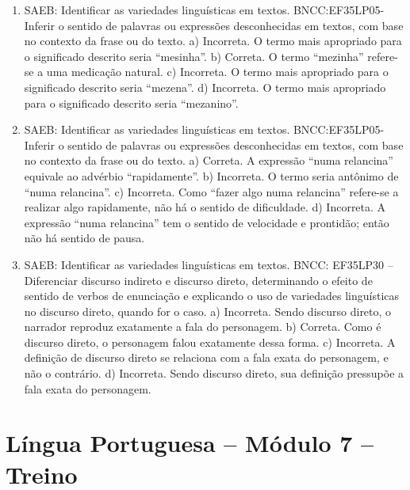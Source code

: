 \begin{enumerate}
\item
SAEB: Identificar as variedades linguísticas em textos. BNCC:EF35LP05- Inferir o sentido de palavras ou expressões desconhecidas em textos, com base no contexto da frase ou do texto.
a) Incorreta. O termo mais apropriado para o significado descrito seria
“mesinha”.
b) Correta. O termo “mezinha” refere-se a uma medicação natural.
c) Incorreta. O termo mais apropriado para o significado descrito seria “mezena”.
d) Incorreta. O termo mais apropriado para o significado descrito seria
“mezanino”.

\item
SAEB: Identificar as variedades linguísticas em textos. BNCC:EF35LP05- Inferir o sentido de palavras ou expressões desconhecidas em textos, com base no contexto da frase ou do texto.
a) Correta. A expressão “numa relancina” equivale ao advérbio “rapidamente”.
b) Incorreta. O termo seria antônimo de “numa relancina”.
c) Incorreta. Como “fazer algo numa relancina” refere-se a realizar algo rapidamente,
não há o sentido de dificuldade.
d) Incorreta. A expressão “numa relancina” tem o sentido de velocidade e prontidão;
então não há sentido de pausa.

\item
SAEB: Identificar as variedades linguísticas em textos. BNCC: EF35LP30 – Diferenciar discurso indireto e discurso direto, determinando o efeito de sentido de verbos de enunciação e explicando o uso de variedades linguísticas no discurso direto, quando for
o caso.
a) Incorreta. Sendo discurso direto, o narrador reproduz exatamente a
fala do personagem.
b) Correta. Como é discurso direto, o personagem falou exatamente dessa
forma.
c) Incorreta. A definição de discurso direto se relaciona com a fala
exata do personagem, e não o contrário.
d) Incorreta. Sendo discurso direto, sua definição pressupõe a fala
exata do personagem.
\end{enumerate}

\section*{Língua Portuguesa – Módulo 7 – Treino}


